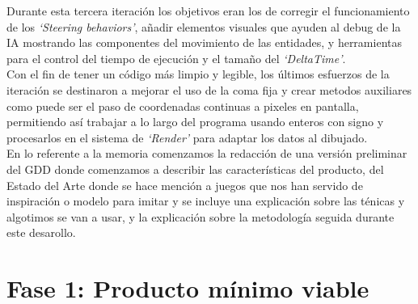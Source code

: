 Durante esta tercera iteración los objetivos eran los de corregir el funcionamiento de los
\textit{`Steering behaviors'}, añadir elementos visuales que ayuden al debug de la \ac{IA}
mostrando las componentes del movimiento de las entidades, y herramientas para el control del
tiempo de ejecución y el tamaño del \textit{`DeltaTime'}.\\
Con el fin de tener un código más limpio y legible, los últimos esfuerzos de la iteración se
destinaron a mejorar el uso de la coma fija y crear metodos auxiliares como puede ser el paso de
coordenadas continuas a pixeles en pantalla, permitiendo así trabajar a lo largo del programa 
usando enteros con signo y procesarlos en el sistema de \textit{`Render'} para adaptar los datos
al dibujado.\\
En lo referente a la memoria comenzamos la redacción de una versión preliminar del \ac{GDD}
donde comenzamos a describir las características del producto, del Estado del Arte donde se hace
mención a juegos que nos han servido de inspiración o modelo para imitar y se incluye una explicación
sobre las ténicas y algotimos se van a usar, y la explicación sobre la metodología seguida durante
este desarollo. 

\section{Fase 1: Producto mínimo viable}

